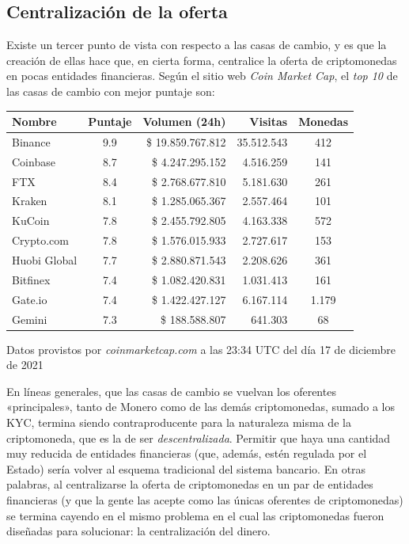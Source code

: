 \documentclass[12pt,a4paper,twoside]{book}
\begin{document}
\subsection{Centralización de la oferta}
Existe un tercer punto de vista con respecto a las casas de cambio, y es que la creación de ellas hace que, en cierta forma, centralice la oferta de criptomonedas en pocas entidades financieras. Según el sitio web \textit{Coin Market Cap}, el \textit{top 10} de las casas de cambio con mejor puntaje son:

\begin{tabular}{|l|c|r|r|c|}
\hline
\textbf{Nombre} & \textbf{Puntaje} & \textbf{Volumen (24h)} & \textbf{Visitas} & \textbf{Monedas} \\
\hline
Binance & 9.9 & \$ 19.859.767.812 & 35.512.543 & 412 \\
\hline
Coinbase & 8.7 & \$ 4.247.295.152 & 4.516.259 & 141 \\
\hline
FTX & 8.4 & \$ 2.768.677.810 & 5.181.630 & 261 \\
\hline
Kraken & 8.1 & \$ 1.285.065.367 & 2.557.464 & 101 \\
\hline
KuCoin & 7.8 & \$ 2.455.792.805 & 4.163.338 & 572 \\
\hline
Crypto.com & 7.8 & \$ 1.576.015.933 & 2.727.617 & 153 \\
\hline
Huobi Global & 7.7 & \$ 2.880.871.543 & 2.208.626 & 361 \\
\hline
Bitfinex & 7.4 & \$ 1.082.420.831 & 1.031.413 & 161 \\
\hline
Gate.io & 7.4 & \$ 1.422.427.127 & 6.167.114 & 1.179 \\
\hline
Gemini & 7.3 & \$ 188.588.807 & 641.303 & 68 \\
\hline
\end{tabular} 
\begin{flushright}
\begin{footnotesize}
Datos provistos por \textit{coinmarketcap.com} a las 23:34 UTC del día 17 de diciembre de 2021
\end{footnotesize}
\end{flushright}

En líneas generales, que las casas de cambio se vuelvan los oferentes «principales», tanto de Monero como de las demás criptomonedas, sumado a los KYC, termina siendo contraproducente para la naturaleza misma de la criptomoneda, que es la de ser \textit{descentralizada}. Permitir que haya una cantidad muy reducida de entidades financieras (que, además, estén regulada por el Estado) sería volver al esquema tradicional del sistema bancario. En otras palabras, al centralizarse la oferta de criptomonedas en un par de entidades financieras (y que la gente las acepte como las únicas oferentes de criptomonedas) se termina cayendo en el mismo problema en el cual las criptomonedas fueron diseñadas para solucionar: la centralización del dinero.
\end{document}
